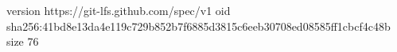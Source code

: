 version https://git-lfs.github.com/spec/v1
oid sha256:41bd8e13da4e119c729b852b7f6885d3815c6eeb30708ed08585ff1cbcf4c48b
size 76
